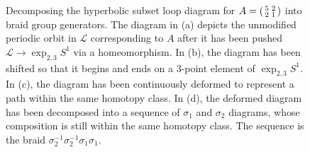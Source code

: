 \documentclass[12pt,twoside]{reedthesis}
\theoremstyle{definition}
\newcommand{\LS}{\mathcal{L}}
\begin{document}
\begin{figure}[p]
\begin{subfigure}[t]{0.24\linewidth}
    \caption{}
  \end{subfigure}
  \caption{Decomposing the hyperbolic subset loop diagram for $A = 
  \protect\begin{psmallmatrix}5 & 2 \\ 2 & 1\protect\end{psmallmatrix}$ into braid group generators. The diagram in (a) depicts the unmodified periodic orbit in $\LS$ corresponding to $A$ after it has been pushed $\LS \to \exp_{2,3} S^1$ via a homeomorphism. In (b), the diagram has been shifted so that it begins and ends on a 3-point element of $\exp_{2,3} S^1$. In (c), the diagram has been continuously deformed to represent a path within the same homotopy class. In (d), the deformed diagram has been decomposed into a sequence of $\sigma_1$ and $\sigma_2$ diagrams, whose composition is still within the same homotopy class. The sequence is the braid $\sigma_2^{-1} \sigma_2^{-1} \sigma_1 \sigma _1$.} 
  \label{fig:subset_loop_decompositions_1}
\end{figure}
\end{document}
